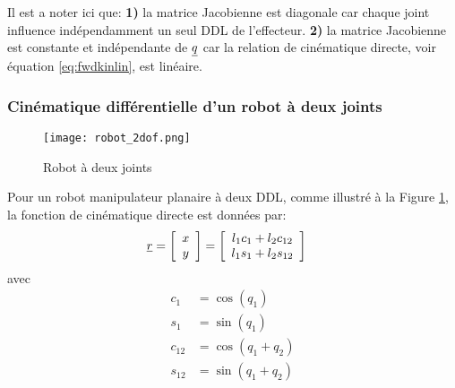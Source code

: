 Il est a noter ici que: \textbf{1)} la matrice Jacobienne est diagonale car chaque joint influence indépendamment un seul DDL de l'effecteur. \textbf{2)} la matrice Jacobienne est constante et indépendante de $\underline{q}$ car la relation de cinématique directe, voir équation \eqref{eq:fwdkinlin}, est linéaire. 


\subsubsection{Cinématique différentielle d'un robot à deux joints}
\label{sec:kindiff_2dof}

\begin{figure}[H]
	\centering
		\texttt{[image: robot\_2dof.png]}
	\caption{Robot à deux joints}
	\label{fig:robot_2dof}
\end{figure}

Pour un robot manipulateur planaire à deux DDL, comme illustré à la Figure \ref{fig:robot_2dof}, la fonction de cinématique directe est données par:
\begin{align}
\underline{r} &= \left[ \begin{array}{c} x \\ y  \end{array} \right]  = \left[ \begin{array}{c} 
 l_1 c_1 + l_2 c_{12} \\ 
 l_1 s_1 + l_2 s_{12}  
\end{array} \right] 
\label{eq:kinfwd2dof}
\end{align} 
avec
\begin{align}
c_1    &= \cos( q_1 ) \\
s_1    &= \sin( q_1 ) \\
c_{12} &= \cos( q_1 + q_2 ) \\
s_{12} &= \sin( q_1 + q_2 )
\end{align} 


